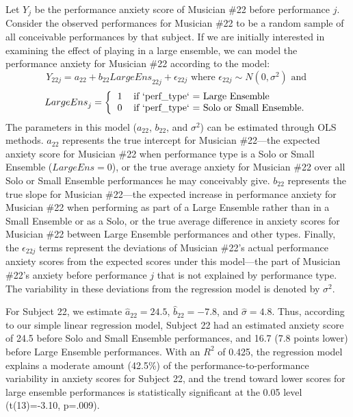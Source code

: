 \documentclass[
]{krantz}
\begin{document}
Let \(Y_{j}\) be the performance anxiety score of Musician \#22 before performance \(j\). Consider the observed performances for Musician \#22 to be a random sample of all conceivable performances by that subject. If we are initially interested in examining the effect of playing in a large ensemble, we can model the performance anxiety for Musician \#22 according to the model:
\begin{equation}
Y_{22j}=a_{22}+b_{22}\textstyle{LargeEns}_{22j}+\epsilon_{22j} \textrm{ where } \epsilon_{22j}\sim N(0,\sigma^2) \textrm{ and }
\label{eq:level1a}
\end{equation}
\[ \textstyle{LargeEns}_{j} =
\left\lbrace
\begin{tabular}{l l} 
1 & if `perf\_type` = Large Ensemble \\
0 & if `perf\_type` = Solo or Small Ensemble. 
\end{tabular}\right.
\]
The parameters in this model (\(a_{22}\), \(b_{22}\), and \(\sigma^2\)) can be estimated through OLS methods. \(a_{22}\) represents the true intercept for Musician \#22---the expected anxiety score for Musician \#22 when performance type is a Solo or Small Ensemble (\(\textstyle{LargeEns}=0\)), or the true average anxiety for Musician \#22 over all Solo or Small Ensemble performances he may conceivably give. \(b_{22}\) represents the true slope for Musician \#22---the expected increase in performance anxiety for Musician \#22 when performing as part of a Large Ensemble rather than in a Small Ensemble or as a Solo, or the true average difference in anxiety scores for Musician \#22 between Large Ensemble performances and other types. Finally, the \(\epsilon_{22j}\) terms represent the deviations of Musician \#22's actual performance anxiety scores from the expected scores under this model---the part of Musician \#22's anxiety before performance \(j\) that is not explained by performance type. The variability in these deviations from the regression model is denoted by \(\sigma^2\).

For Subject 22, we estimate \(\hat{a}_{22}=24.5\), \(\hat{b}_{22}=-7.8\), and \(\hat{\sigma}=4.8\). Thus, according to our simple linear regression model, Subject 22 had an estimated anxiety score of 24.5 before Solo and Small Ensemble performances, and 16.7 (7.8 points lower) before Large Ensemble performances. With an \(R^2\) of 0.425, the regression model explains a moderate amount (42.5\%) of the performance-to-performance variability in anxiety scores for Subject 22, and the trend toward lower scores for large ensemble performances is statistically significant at the 0.05 level (t(13)=-3.10, p=.009).
\end{document}
